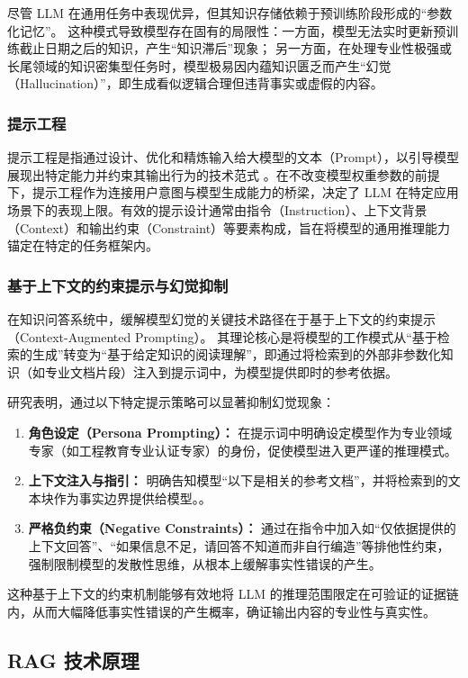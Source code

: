 \documentclass[UTF8,a4paper,zihao=-4]{ctexart}
\begin{document}
尽管 LLM 在通用任务中表现优异，但其知识存储依赖于预训练阶段形成的“参数化记忆”。
这种模式导致模型存在固有的局限性：一方面，模型无法实时更新预训练截止日期之后的知识，产生“知识滞后”现象；
另一方面，在处理专业性极强或长尾领域的知识密集型任务时，模型极易因内蕴知识匮乏而产生“幻觉（Hallucination）”，即生成看似逻辑合理但违背事实或虚假的内容\cite{zlj_llmrag_2024}。


\subsubsection{提示工程}
提示工程是指通过设计、优化和精炼输入给大模型的文本（Prompt），以引导模型展现出特定能力并约束其输出行为的技术范式
。在不改变模型权重参数的前提下，提示工程作为连接用户意图与模型生成能力的桥梁，决定了 LLM 在特定应用场景下的表现上限。有效的提示设计通常由指令（Instruction）、上下文背景（Context）和输出约束（Constraint）等要素构成，旨在将模型的通用推理能力锚定在特定的任务框架内。

\subsubsection{基于上下文的约束提示与幻觉抑制}
在知识问答系统中，缓解模型幻觉的关键技术路径在于基于上下文的约束提示（Context-Augmented Prompting）。
其理论核心是将模型的工作模式从“基于检索的生成”转变为“基于给定知识的阅读理解”，即通过将检索到的外部非参数化知识（如专业文档片段）注入到提示词中，为模型提供即时的参考依据\cite{gao_retrieval-augmented_2024}。

研究表明，通过以下特定提示策略可以显著抑制幻觉现象：
\begin{enumerate}
    \item \textbf{角色设定（Persona Prompting）：} 在提示词中明确设定模型作为专业领域专家（如工程教育专业认证专家）的身份，促使模型进入更严谨的推理模式。
    \item \textbf{上下文注入与指引：} 明确告知模型“以下是相关的参考文档”，并将检索到的文本块作为事实边界提供给模型。\cite{gao_retrieval-augmented_2024}。
    \item \textbf{严格负约束（Negative Constraints）：} 通过在指令中加入如“仅依据提供的上下文回答”、“如果信息不足，请回答不知道而非自行编造”等排他性约束，强制限制模型的发散性思维，从根本上缓解事实性错误的产生。
\end{enumerate}
这种基于上下文的约束机制能够有效地将 LLM 的推理范围限定在可验证的证据链内，从而大幅降低事实性错误的产生概率，确证输出内容的专业性与真实性。
\subsection{RAG 技术原理}
\end{document}
